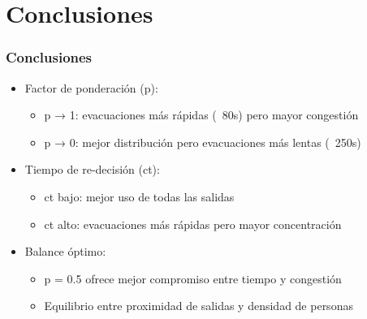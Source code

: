 \documentclass[aspectratio=169]{beamer}
\begin{document}
\section{Conclusiones}

\begin{frame}
    \frametitle{Conclusiones}
    
    \begin{itemize}
        \item Factor de ponderación (p):
        \begin{itemize}
            \item p → 1: evacuaciones más rápidas (~80s) pero mayor congestión
            \item p → 0: mejor distribución pero evacuaciones más lentas (~250s)
        \end{itemize}
        \item Tiempo de re-decisión (ct):
        \begin{itemize}
            \item ct bajo: mejor uso de todas las salidas
            \item ct alto: evacuaciones más rápidas pero mayor concentración
        \end{itemize}
        \item Balance óptimo:
        \begin{itemize}
            \item p = 0.5 ofrece mejor compromiso entre tiempo y congestión
            \item Equilibrio entre proximidad de salidas y densidad de personas
        \end{itemize}
    \end{itemize}    
\end{frame}
\end{document}
